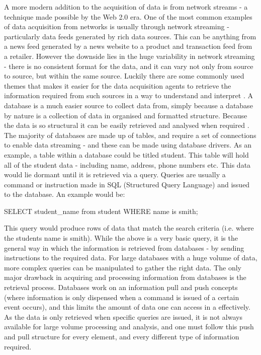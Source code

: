 A more modern addition to the acquisition of data is from network streams  - a technique made possible by the Web 2.0 era. One of the most common examples of data acquisition from networks is usually through network streaming - particularly data feeds generated by rich data sources. This can be anything from a news feed generated by a news website to a product and transaction feed from a retailer. However the downside lies in the huge variability in network streaming - there is no consistent format for the data, and it can vary not only from source to source, but within the same source. Luckily there are some commonly used themes that makes it easier for the data acquisition agents to retrieve the information required from such sources in a way to understand and interpret \cite{nandy2014real}. A database is a much easier source to collect data from, simply because a database by nature is a collection of data in organised and formatted structure. Because the data is so structural it can be easily retrieved and analysed when required \cite{urban2014integrated}. The majority of databases are made up of tables, and require a set of connections to enable data streaming - and these can be made using database drivers. As an example, a table within a database could be titled student. This table will hold all of the student data - including name, address, phone numbers etc. This data would lie dormant until it is retrieved via a query. Queries are usually a command or instruction made in SQL (Structured Query Language) and issued to the database. An example would be:

\begin{listing}
SELECT student_name from student WHERE name is smith;
\end{listing}

This query would produce rows of data that match the search criteria (i.e. where the students name is smith). While the above is a very basic query, it is the general way in which the information is retrieved from databases - by sending instructions to the required data. For large databases with a huge volume of data, more complex queries can be manipulated to gather the right data. The only major drawback in acquiring and processing information from databases is the retrieval process. Databases work on an information pull and push concepts (where information is only dispensed when a command is issued of a certain event occurs), and this limits the amount of data one can access in a effectively. As the data is only retrieved when specific queries are issued, it is not always available for large volume processing and analysis, and one must follow this push and pull structure for every element, and every different type of information required.

